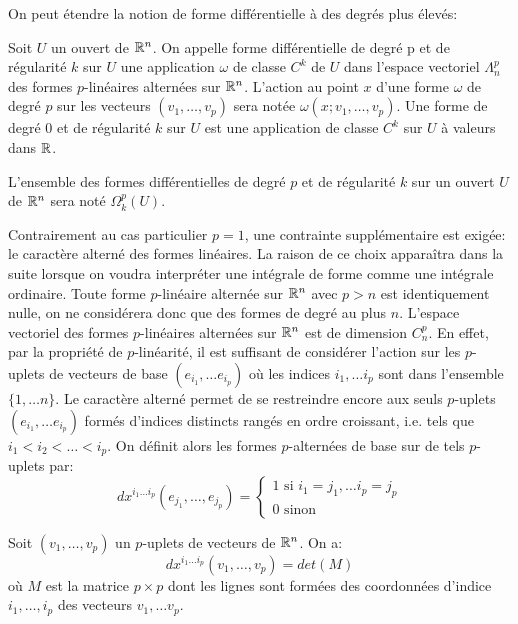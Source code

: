 On peut étendre la notion de forme différentielle à des degrés plus élevés:
\begin{fdefn}
Soit $U$ un ouvert de $\mathbb{R}^n$. On appelle forme différentielle de degré p et de régularité $k$ sur $U$ une application $\omega$ de classe $C^k$ de $U$ dans l'espace vectoriel $\Lambda^p_n$ des formes $p$-linéaires alternées sur $\mathbb{R}^n$. L'action au point $x$ d'une forme $\omega$ de degré $p$ sur les vecteurs $(v_1, \dots, v_p)$ sera notée $\omega(x;v_1,\dots,v_p)$. Une forme de degré 0 et de régularité $k$ sur $U$ est une application de classe $C^k$ sur $U$ à valeurs dans $\mathbb{R}$. 
\end{fdefn}
\begin{notation}
L'ensemble des formes différentielles de degré $p$ et de régularité $k$ sur un ouvert $U$ de $\mathbb{R}^n$ sera noté $\Omega_k^p(U)$.
\end{notation}
Contrairement au cas particulier $p=1$, une contrainte supplémentaire est exigée: le caractère alterné des formes linéaires. La raison de ce choix apparaîtra dans la suite lorsque on voudra interpréter une intégrale de forme comme une intégrale ordinaire.
Toute forme $p$-linéaire alternée sur $\mathbb{R}^n$ avec $p > n$ est identiquement nulle, on ne considérera donc que des formes de degré au plus $n$. L'espace vectoriel des formes $p$-linéaires alternées sur $\mathbb{R}^n$ est de dimension $C_n^p$. En effet, par la propriété de $p$-linéarité, il est suffisant de considérer l'action sur les $p$-uplets de vecteurs de base $(e_{i_1},\dots e_{i_p})$ où les indices $i_1,\dots i_p$ sont dans l'ensemble $\{1, \dots n\}$. Le caractère alterné permet de se restreindre encore aux seuls $p$-uplets $(e_{i_1},\dots e_{i_p})$ formés d'indices distincts rangés en ordre croissant, i.e. tels que $i_1 < i_2 < \dots < i_p$. On définit alors les formes $p$-alternées de base sur de tels $p$-uplets par:
\[
dx^{i_1\dots i_p}(e_{j_1},\dots,e_{j_p}) = \begin{cases}
1 \text{ si } i_1=j_1,\dots i_p=j_p \\
0 \text{ sinon }
\end{cases}
\]
\begin{fprop}
Soit $(v_1,\dots,v_p)$ un $p$-uplets de vecteurs de $\mathbb{R}^n$. On a:
\[
dx^{i_1\dots i_p}(v_1,\dots,v_p) = det(M) 
\]
où $M$ est la matrice $p \times p$ dont les lignes sont formées des coordonnées d'indice $i_1, \dots, i_p$ des vecteurs $v_1,\dots v_p$.
\end{fprop}
